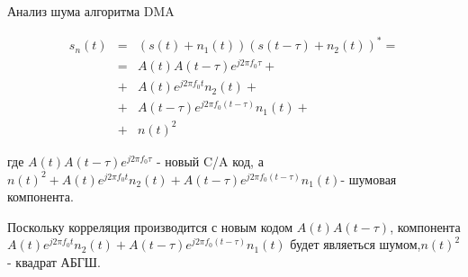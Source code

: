 Анализ шума алгоритма DMA 

\begin{center}
\begin{eqnarray}
	s_{n}(t) & = & (s(t)+n_{1}(t))(s(t-\tau)+n_{2}(t))^{*}=\nonumber \\
	 & = & A(t)A(t-\tau)e^{j2{\pi}f_{0}{\tau}}+\nonumber \\
	 & + & A(t)e^{j2{\pi}f_{0}t}n_{2}(t)+\label{eq:dma_noise}\\
	 & + & A(t-\tau)e^{j2{\pi}f_{0}(t-\tau)}n_{1}(t)+\nonumber \\
	 & + & n(t)^{2}\nonumber 
\end{eqnarray}
\end{center}

где $A(t)A(t-\tau)e^{j2{\pi}f_{0}{\tau}}$ - новый C/A код, а $n(t)^{2}+A(t)e^{j2{\pi}f_{0}t}n_{2}(t)+A(t-\tau)e^{j2{\pi}f_{0}(t-\tau)}n_{1}(t)$-
шумовая компонента.

Поскольку корреляция производится с \textquotedbl{}новым\textquotedbl{}
кодом $A(t)A(t-\tau)$, компонента $A(t)e^{j2{\pi}f_{0}t}n_{2}(t)+A(t-\tau)e^{j2{\pi}f_{0}(t-\tau)}n_{1}(t)$
будет являеться шумом,$n(t)^{2}$ - квадрат АБГШ.

\newpage
